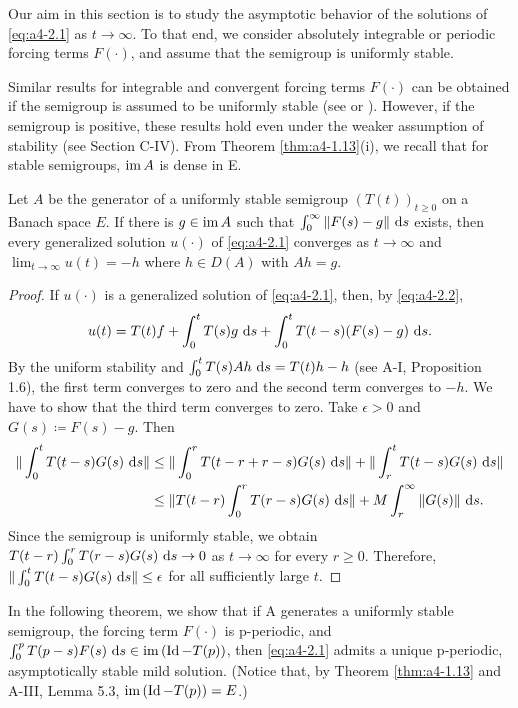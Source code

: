 \bigskip
\noindent
Our aim in this section is to study the asymptotic behavior of the solutions of \eqref{eq:a4-2.1} as $t \to \infty$. 
To that end, we consider absolutely integrable or periodic forcing terms $F(\cdot)$, and assume that the semigroup
is uniformly stable.

\noindent
Similar results for integrable and convergent forcing terms $F(\cdot)$ can
be obtained if the semigroup is assumed to be uniformly  
stable (see \citet[p.119]{pazy:1983} or \citet{neubrander:1985b}). 
However, if the
semigroup is positive, these results hold even under the weaker assumption of stability (see Section C-IV).
From Theorem \ref{thm:a4-1.13}(i), we recall that for stable
semigroups, $\mathop{}\!\mathrm{im}\, A$ is dense in E.

\begin{theorem}\label{thm:a4-2.1}
Let $A$ be the generator of a uniformly stable semigroup
$(T(t))_{t \geq 0}$ on a Banach space $E$. 
If there is $g \in \mathop{}\!\mathrm{im}\, A$ such that
$\int_{0}^{\infty} \|F(s) - g\| \,\mathop{}\!\mathrm{d}{s}$ exists, then every generalized solution $u(\cdot)$ of
\eqref{eq:a4-2.1} converges as $t \to \infty$ and $\lim_{t \to \infty} u(t) = -h$ where $h \in D(A)$ with
$Ah = g$.
\end{theorem}

\begin{proof}
If $u(\cdot)$ is a generalized solution of \eqref{eq:a4-2.1}, then, by \eqref{eq:a4-2.2},
\[
u(t) = T(t)f + \int_{0}^{t} T(s)g \,\mathop{}\!\mathrm{d}{s} + \int_{0}^{t} T(t-s)(F(s)-g) \,\mathop{}\!\mathrm{d}{s}.
\]
By the uniform
stability and $\int_0^t T(s)Ah\,\mathop{}\!\mathrm{d}{s} = T(t)h - h$ (see A-I, Proposition 1.6), the first term converges to zero
and the second term converges to $-h$. 
We have to show that the
third term converges to zero. 
Take $\epsilon > 0$ and $G(s) \coloneqq F(s)-g$. 
Then
\begin{align*}
\|\int_{0}^{t} T(t-s)G(s) \,\mathop{}\!\mathrm{d}{s}\| &\leq \|\int_{0}^{r} T(t-r+r-s)G(s) \,\mathop{}\!\mathrm{d}{s}\| + \|\int_{r}^{t} T(t-s)G(s) \,\mathop{}\!\mathrm{d}{s}\|\\
&\leq \|T(t-r)\int_{0}^{r} T(r-s)G(s) \,\mathop{}\!\mathrm{d}{s}\| + M \int_{r}^{\infty} \|G(s)\| \,\mathop{}\!\mathrm{d}{s}.
\end{align*}
Since the semigroup is uniformly stable, we obtain
$T(t-r)\int_{0}^{r} T(r-s)G(s) \,\mathop{}\!\mathrm{d}{s} \to 0$ as $t \to \infty$ for every $r \geq 0$.
Therefore, $\|\int_{0}^{t} T(t-s)G(s) \,\mathop{}\!\mathrm{d}{s}\| \leq \epsilon$ for all sufficiently large $t$.
\end{proof}
\noindent
In the following theorem, we show that if A generates a
uniformly stable semigroup, the forcing term $F(\cdot)$ is p-periodic,
and $\int_{0}^{p} T(p-s)F(s) \,\mathop{}\!\mathrm{d}{s} \in \mathop{}\!\mathrm{im}\,(\operatorname{Id} - T(p))$, then \eqref{eq:a4-2.1}
admits a unique p-periodic, asymptotically stable mild solution. (Notice that, by
Theorem \ref{thm:a4-1.13} and A-III, Lemma 5.3, $\mathop{}\!\mathrm{im}\,(\operatorname{Id} - T(p)) = E$.)

